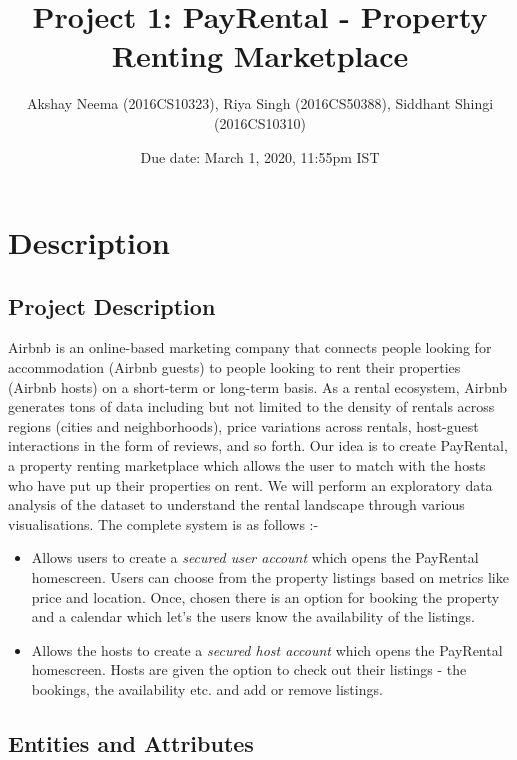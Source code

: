 \documentclass[10pt]{article}
\title{Project 1: 
PayRental - Property Renting Marketplace}
\author {Akshay Neema (2016CS10323), Riya Singh (2016CS50388), Siddhant Shingi (2016CS10310)}
\date{Due date: March 1, 2020, 11:55pm IST}
\begin{document}
\maketitle
\section{Description}
\subsection{Project Description}
Airbnb is an online-based marketing company that connects people looking for accommodation (Airbnb guests) to people looking to rent their properties (Airbnb hosts) on a short-term or long-term basis. As a rental ecosystem, Airbnb generates tons of data including but not limited to the density of rentals across regions (cities and neighborhoods), price variations across rentals, host-guest interactions in the form of reviews, and so forth. \newline
\newline
Our idea is to create PayRental, a property renting marketplace which allows the user to match with the hosts who have put up their properties on rent. We will perform an exploratory data analysis of the dataset to understand the rental landscape through various visualisations. The complete system is as follows :-
\begin{itemize}
    \item Allows users to create a \textit{secured user account} which opens the PayRental homescreen. Users can choose from the property listings based on metrics like price and location. Once, chosen there is an option for booking the property and a calendar which let's the users know the availability of the listings. 
    \item Allows the hosts to create a \textit{secured host account} which opens the PayRental homescreen. Hosts are given the option to check out their listings - the bookings, the availability etc. and add or remove listings. 
\end{itemize}

\subsection{Entities and Attributes}
\end{document}

